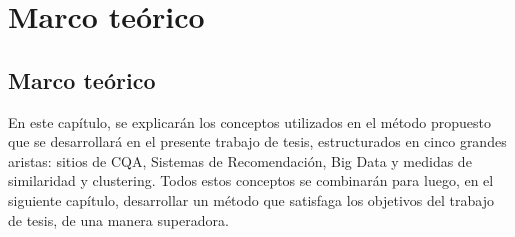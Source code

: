 \chapter*{Marco teórico}\label{ch:marcoteorico}

\section*{Marco teórico}
\addtocounter{section}{1}
\setcounter{subsection}{0}

En este capítulo, se explicarán los conceptos utilizados en el método propuesto que se desarrollará en el presente trabajo de tesis, estructurados en cinco grandes aristas: sitios de CQA, Sistemas de Recomendación, Big Data y medidas de similaridad y clustering. Todos estos conceptos se combinarán para luego, en el siguiente capítulo, desarrollar un método que satisfaga los objetivos del trabajo de tesis, de una manera superadora.








